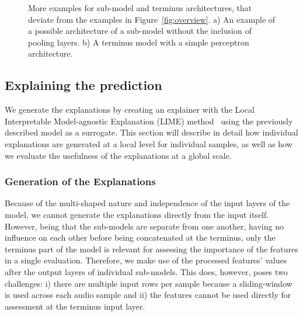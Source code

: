 \documentclass{article}
\begin{document}
\begin{figure}[htbp]
	\centering
	\hfil
	\caption{More examples for sub-model and terminus architectures, that deviate from the examples in Figure~\ref{fig:overview}. a) An example of a possible architecture of a sub-model without the inclusion of pooling layers. b) A terminus model with a simple perceptron architecture.}
    \label{fig:alt_model_arch}
\end{figure}

\subsection{Explaining the prediction}		\label{sec:method_exp}
		
We generate the explanations by creating an explainer with the Local Interpretable Model-agnostic Explanation (LIME) method~\cite{ribeiro_why_2016} using the previously described model as a surrogate. This section will describe in detail how individual explanations are generated at a local level for individual samples, as well as how we evaluate the usefulness of the explanations at a global scale.

\subsubsection{Generation of the Explanations}
Because of the multi-shaped nature and independence of the input layers of the model, we cannot generate the explanations directly from the input itself. However, being that the sub-models are separate from one another, having no influence on each other before being concatenated at the terminus, only the terminus part of the model is relevant for assessing the importance of the features in a single evaluation. Therefore, we make use of the processed features' values after the output layers of individual sub-models. This does, however, poses two challenges: i) there are multiple input rows per sample because a sliding-window is used across each audio sample and ii) the features cannot be used directly for assessment at the terminus input layer.
\end{document}
